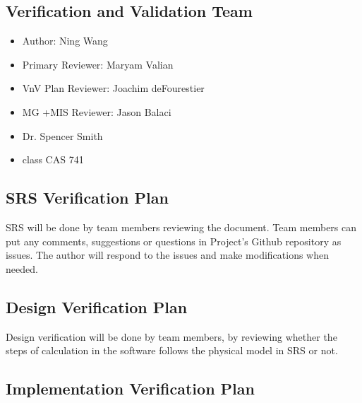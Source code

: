 \documentclass[12pt, titlepage]{article}
\begin{document}
\subsection{Verification and Validation Team}

\begin{itemize}
	\item Author: Ning Wang
\end{itemize}

\begin{itemize}
	\item Primary Reviewer: Maryam Valian
\end{itemize}
\begin{itemize}
	\item VnV Plan Reviewer: Joachim deFourestier
\end{itemize}
\begin{itemize}
	\item MG +MIS Reviewer: Jason Balaci
\end{itemize}

\begin{itemize}
	\item Dr. Spencer Smith
\end{itemize}
\begin{itemize}
	\item class CAS 741
\end{itemize}
\subsection{SRS Verification Plan}

SRS will be done by team members reviewing the document. Team members can put any comments, suggestions or questions in Project's Github repository as issues.
The author will respond to the issues and make modifications when needed.

\subsection{Design Verification Plan}

Design verification will be done by team members, by reviewing whether the steps 
of calculation in the software follows the physical model in SRS or not. 

\subsection{Implementation Verification Plan}
\end{document}
